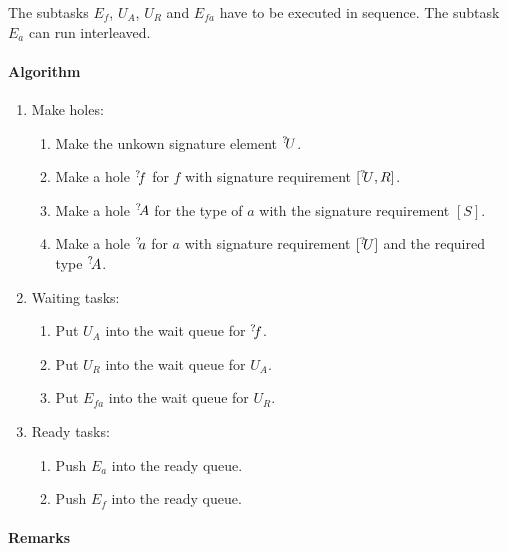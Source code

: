 The subtasks $E_f$, $U_A$, $U_R$ and $E_{fa}$ have to be executed in sequence. The
subtask $E_a$ can run interleaved.


\paragraph{Algorithm}
\begin{enumerate}
    \item Make holes:
        \begin{enumerate}
            \item Make the unkown signature element ${{}^? \kern-0.2em U}$.

            \item Make a hole ${{}^? \kern-0.2em f}$ for $f$ with signature requirement $[{{}^? \kern-0.2em U}, R]$.

            \item Make a hole ${{}^? \kern-0.2em A}$ for the type of $a$ with the signature
                requirement $[S]$.

            \item Make a hole ${{}^? \kern-0.2em a}$ for $a$ with signature requirement $[{{}^? \kern-0.2em U}]$
                and the
                required type ${{}^? \kern-0.2em A}$.
        \end{enumerate}

    \item Waiting tasks:
        \begin{enumerate}
            \item Put $U_{A}$ into the wait queue for ${{}^? \kern-0.2em f}$.

            \item Put $U_R$ into the wait queue for $U_A$.

            \item Put $E_{fa}$ into the wait queue for $U_R$.
        \end{enumerate}

    \item Ready tasks:
        \begin{enumerate}
            \item Push $E_a$ into the ready queue.

            \item Push $E_f$ into the ready queue.
        \end{enumerate}
\end{enumerate}


\paragraph{Remarks}

